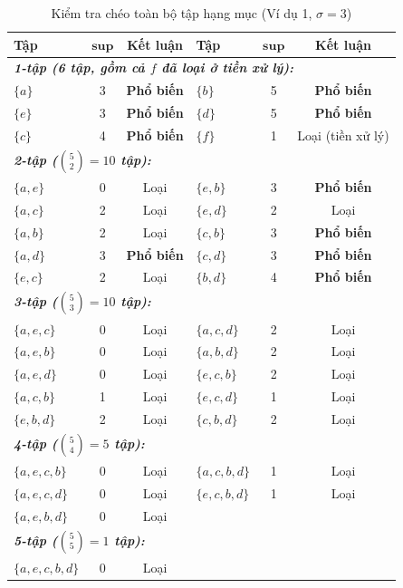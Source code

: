 \documentclass[12pt,a4paper]{report}
\begin{document}
\begin{table}[H]
  \centering
  \caption{Kiểm tra chéo toàn bộ tập hạng mục (Ví dụ 1, $\sigma = 3$)}
  \label{tab:ex1-crosscheck}
  \begin{tabular}{lcc@{\hskip 1.5em}lcc}
    \toprule
    \textbf{Tập} & $\mathbf{sup}$ & \textbf{Kết luận}
      & \textbf{Tập} & $\mathbf{sup}$ & \textbf{Kết luận} \\
    \midrule
    \multicolumn{6}{l}{\textit{\textbf{1-tập (6 tập, gồm cả $f$ đã loại ở tiền xử lý):}}} \\
    $\{a\}$      & 3 & {\textbf{Phổ biến}} & $\{b\}$     & 5 & {\textbf{Phổ biến}} \\
    $\{e\}$      & 3 & {\textbf{Phổ biến}} & $\{d\}$     & 5 & {\textbf{Phổ biến}} \\
    $\{c\}$      & 4 & {\textbf{Phổ biến}} & $\{f\}$     & 1 & {Loại (tiền xử lý)} \\
    \midrule
    \multicolumn{6}{l}{\textit{\textbf{2-tập ($\binom{5}{2} = 10$ tập):}}} \\
    $\{a,e\}$    & 0 & {Loại}             & $\{e,b\}$   & 3 & {\textbf{Phổ biến}} \\
    $\{a,c\}$    & 2 & {Loại}             & $\{e,d\}$   & 2 & {Loại} \\
    $\{a,b\}$    & 2 & {Loại}             & $\{c,b\}$   & 3 & {\textbf{Phổ biến}} \\
    $\{a,d\}$    & 3 & {\textbf{Phổ biến}} & $\{c,d\}$   & 3 & {\textbf{Phổ biến}} \\
    $\{e,c\}$    & 2 & {Loại}             & $\{b,d\}$   & 4 & {\textbf{Phổ biến}} \\
    \midrule
    \multicolumn{6}{l}{\textit{\textbf{3-tập ($\binom{5}{3} = 10$ tập):}}} \\
    $\{a,e,c\}$  & 0 & {Loại}   & $\{a,c,d\}$  & 2 & {Loại} \\
    $\{a,e,b\}$  & 0 & {Loại}   & $\{a,b,d\}$  & 2 & {Loại} \\
    $\{a,e,d\}$  & 0 & {Loại}   & $\{e,c,b\}$  & 2 & {Loại} \\
    $\{a,c,b\}$  & 1 & {Loại}   & $\{e,c,d\}$  & 1 & {Loại} \\
    $\{e,b,d\}$  & 2 & {Loại}   & $\{c,b,d\}$  & 2 & {Loại} \\
    \midrule
    \multicolumn{6}{l}{\textit{\textbf{4-tập ($\binom{5}{4} = 5$ tập):}}} \\
    $\{a,e,c,b\}$  & 0 & {Loại}   & $\{a,c,b,d\}$  & 1 & {Loại} \\
    $\{a,e,c,d\}$  & 0 & {Loại}   & $\{e,c,b,d\}$  & 1 & {Loại} \\
    $\{a,e,b,d\}$  & 0 & {Loại}   &               &   &  \\
    \midrule
    \multicolumn{6}{l}{\textit{\textbf{5-tập ($\binom{5}{5} = 1$ tập):}}} \\
    $\{a,e,c,b,d\}$ & 0 & {Loại} &               &   &  \\
    \bottomrule
  \end{tabular}
\end{table}
 
\end{document}
